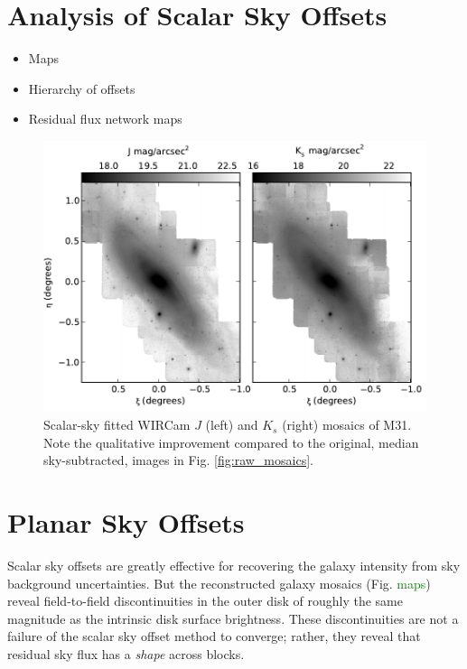 \documentclass[iop]{emulateapj}
\newcommand{\todo}[1]{\textcolor{green}{#1}}
\begin{document}
\section{Analysis of Scalar Sky Offsets}

\begin{itemize}
\item Maps
\item Hierarchy of offsets
\item Residual flux network maps
\end{itemize}

\begin{figure}[t]
	\centering
		\includegraphics[width=6in]{figs/scalar_mosaics}
	\caption{Scalar-sky fitted WIRCam $J$ (left) and $K_s$ (right) mosaics of M31. Note the qualitative improvement compared to the original, median sky-subtracted, images in Fig. \ref{fig:raw_mosaics}.}
	\label{fig:scalar_mosaics}
\end{figure}

\section{Planar Sky Offsets}

Scalar sky offsets are greatly effective for recovering the galaxy intensity from sky background uncertainties. But the reconstructed galaxy mosaics (Fig. \todo{maps}) reveal field-to-field discontinuities in the outer disk of roughly the same magnitude as the intrinsic disk surface brightness. These discontinuities are not a failure of the scalar sky offset method to converge; rather, they reveal that residual sky flux has a \emph{shape} across blocks.
\end{document}
